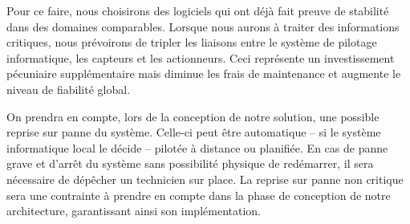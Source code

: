 \documentclass[a4paper, 11pt]{article}
\begin{document}
Pour ce faire, nous choisirons des logiciels qui ont déjà fait preuve de stabilité dans des domaines comparables. Lorsque nous aurons à traiter des informations critiques, nous prévoirons de tripler les liaisons entre le système de pilotage informatique, les capteurs et les actionneurs. Ceci représente un investissement pécuniaire supplémentaire mais diminue les frais de maintenance et augmente le niveau de fiabilité global.

On prendra en compte, lors de la conception de notre solution, une possible reprise sur panne du système. Celle-ci peut être automatique -- si le système informatique local le décide -- pilotée à distance ou planifiée. En cas de panne grave et d'arrêt du système sans possibilité physique de redémarrer, il sera nécessaire de dépêcher un technicien sur place. La reprise sur panne non critique sera une contrainte à prendre en compte dans la phase de conception de notre architecture, garantissant ainsi son implémentation.
\end{document}
